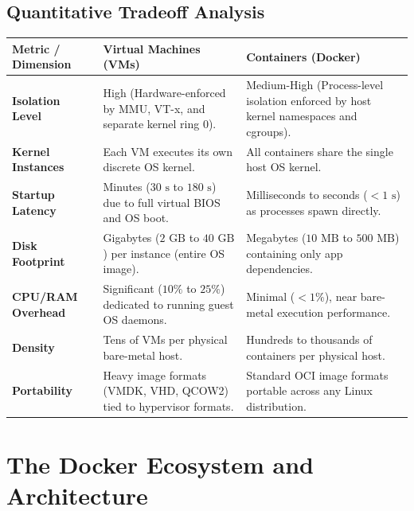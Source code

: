 \documentclass[11pt,a4paper,openany]{report}
\begin{document}
\subsection{Quantitative Tradeoff Analysis}
\begin{center}
\begin{tabularx}{\textwidth}{>{\bfseries}l X X}
\toprule
Metric / Dimension & Virtual Machines (VMs) & Containers (Docker)\\
\midrule
Isolation Level & High (Hardware-enforced by MMU, VT-x, and separate kernel ring 0). & Medium-High (Process-level isolation enforced by host kernel namespaces and cgroups).\\
Kernel Instances & Each VM executes its own discrete OS kernel. & All containers share the single host OS kernel.\\
Startup Latency & Minutes ($30\text{ s}$ to $180\text{ s}$) due to full virtual BIOS and OS boot. & Milliseconds to seconds ($< 1\text{ s}$) as processes spawn directly.\\
Disk Footprint & Gigabytes ($2\text{ GB}$ to $40\text{ GB}$) per instance (entire OS image). & Megabytes ($10\text{ MB}$ to $500\text{ MB}$) containing only app dependencies.\\
CPU/RAM Overhead & Significant ($10\%$ to $25\%$) dedicated to running guest OS daemons. & Minimal ($< 1\%$), near bare-metal execution performance.\\
Density & Tens of VMs per physical bare-metal host. & Hundreds to thousands of containers per physical host.\\
Portability & Heavy image formats (VMDK, VHD, QCOW2) tied to hypervisor formats. & Standard OCI image formats portable across any Linux distribution.\\
\bottomrule
\end{tabularx}
\end{center}

\section{The Docker Ecosystem and Architecture}
\end{document}
